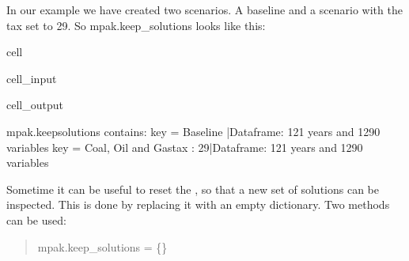 \documentclass[letterpaper,10pt,english]{jupyterBook}
\begin{document}
\sphinxAtStartPar
In our example we have created two scenarios. A baseline and a scenario with the tax set to 29. So mpak.keep\_solutions looks like this:

\begin{sphinxuseclass}{cell}\begin{sphinxVerbatimInput}

\begin{sphinxuseclass}{cell_input}
\begin{sphinxVerbatim}[commandchars=\\\{\}]
    
    \PYG{p}{[}\PYG{p}{]}\PYG{p}{[}\PYG{p}{]}
\end{sphinxVerbatim}

\end{sphinxuseclass}\end{sphinxVerbatimInput}
\begin{sphinxVerbatimOutput}

\begin{sphinxuseclass}{cell_output}
\begin{sphinxVerbatim}[commandchars=\\\{\}]
mpak.keep\PYGZus{}solutions contains:
key = Baseline                 |Dataframe: 121 years and 1290 variables
key = Coal, Oil and Gastax : 29|Dataframe: 121 years and 1290 variables
\end{sphinxVerbatim}

\end{sphinxuseclass}\end{sphinxVerbatimOutput}

\end{sphinxuseclass}
\sphinxAtStartPar
Sometime it can be useful to reset the , so that a new set of solutions can be inspected. This is done by replacing it with an empty dictionary. Two methods can be used:
\begin{quote}

\sphinxAtStartPar
mpak.keep\_solutions = \{\}
\end{quote}
\end{document}
